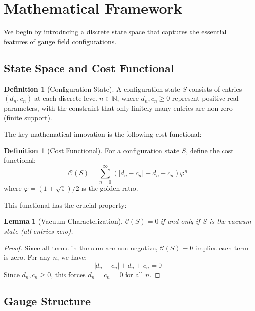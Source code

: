 \documentclass[11pt]{article}
\numberwithin{equation}{section}
\newtheorem{lemma}[theorem]{Lemma}
\theoremstyle{definition}
\newtheorem{definition}[theorem]{Definition}
\theoremstyle{remark}
\begin{document}
\section{Mathematical Framework}
\label{sec:framework}

We begin by introducing a discrete state space that captures the essential features of gauge field configurations.

\subsection{State Space and Cost Functional}

\begin{definition}[Configuration State]
A configuration state $S$ consists of entries $(d_n, c_n)$ at each discrete level $n \in \mathbb{N}$, where $d_n, c_n \geq 0$ represent positive real parameters, with the constraint that only finitely many entries are non-zero (finite support).
\end{definition}

The key mathematical innovation is the following cost functional:

\begin{definition}[Cost Functional]
For a configuration state $S$, define the cost functional:
\begin{equation}
\mathcal{C}(S) = \sum_{n=0}^{\infty} \left(|d_n - c_n| + d_n + c_n\right) \varphi^n
\end{equation}
where $\varphi = (1+\sqrt{5})/2$ is the golden ratio.
\end{definition}

This functional has the crucial property:

\begin{lemma}[Vacuum Characterization]
\label{lem:vacuum}
$\mathcal{C}(S) = 0$ if and only if $S$ is the vacuum state (all entries zero).
\end{lemma}

\begin{proof}
Since all terms in the sum are non-negative, $\mathcal{C}(S) = 0$ implies each term is zero. For any $n$, we have:
\[|d_n - c_n| + d_n + c_n = 0\]
Since $d_n, c_n \geq 0$, this forces $d_n = c_n = 0$ for all $n$.
\end{proof}

\subsection{Gauge Structure}
\end{document}
